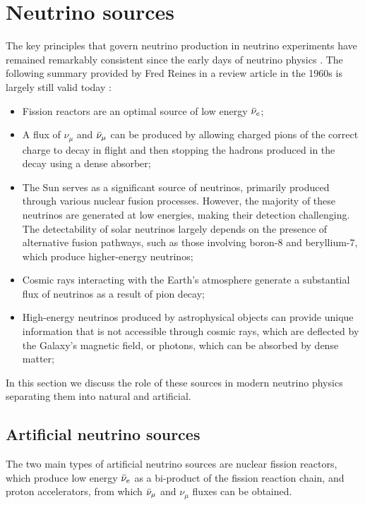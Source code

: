 \section{Neutrino sources}
\label{Sec:NeutrinoSources}
The key principles that govern neutrino production in neutrino experiments have remained remarkably consistent since the early days of neutrino physics \cite{T2KNotes}. The following summary provided by Fred Reines in a review article in the 1960s \cite{Reines:1960we} is largely still valid today : 
\begin{itemize}
    \item Fission reactors are an optimal source of low energy $\Bar{\nu}_e$;
    \item A flux of $\nu_\mu$ and $\Bar{\nu}_\mu$ can be produced by allowing charged pions of the correct charge to decay in flight and then stopping the hadrons produced in the decay using a dense absorber;
    \item The Sun serves as a significant source of neutrinos, primarily produced through various nuclear fusion processes. However, the majority of these neutrinos are generated at low energies, making their detection challenging. The detectability of solar neutrinos largely depends on the presence of alternative fusion pathways, such as those involving boron-8 and beryllium-7, which produce higher-energy neutrinos;
    \item Cosmic rays interacting with the Earth's atmosphere generate a substantial flux of neutrinos as a result of pion decay;
    \item High-energy neutrinos produced by astrophysical objects can provide unique information that is not accessible through cosmic rays, which are deflected by the Galaxy’s magnetic field, or photons, which can be absorbed by dense matter;
\end{itemize}
 In this section we discuss the role of these sources in modern neutrino physics separating them into natural and artificial.
\subsection{Artificial neutrino sources}
\label{Sec:artificial}
The two main types of artificial neutrino sources are nuclear fission reactors, which produce low energy $\Bar{\nu}_e$ as a bi-product of the fission reaction chain, and proton accelerators, from which $\Bar{\nu}_\mu$ and $\nu_\mu$ fluxes can be obtained.

